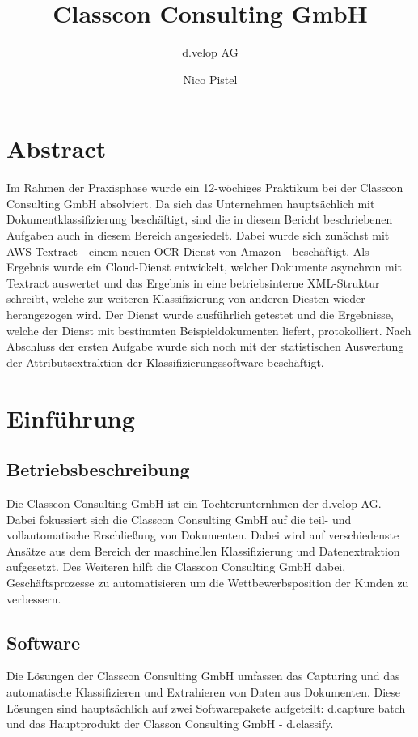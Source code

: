 \documentclass{whswinvcbook}
\title[Bericht]{Classcon Consulting GmbH}
\subtitle{d.velop AG}
\author[Nico Pistel]{Nico Pistel}
\begin{document}
\frontmatter

\maketitle

\cleardoublepage
\chapter*{Abstract}
Im Rahmen der Praxisphase wurde ein 12-wöchiges Praktikum bei der Classcon Consulting GmbH absolviert. Da sich das Unternehmen hauptsächlich mit Dokumentklassifizierung beschäftigt, sind die in diesem Bericht beschriebenen Aufgaben auch in diesem Bereich angesiedelt. Dabei wurde sich zunächst mit AWS Textract - einem neuen OCR Dienst von Amazon - beschäftigt. Als Ergebnis wurde ein Cloud-Dienst entwickelt, welcher Dokumente asynchron mit Textract auswertet und das Ergebnis in eine betriebsinterne XML-Struktur schreibt, welche zur weiteren Klassifizierung von anderen Diesten wieder herangezogen wird. Der Dienst wurde ausführlich getestet und die Ergebnisse, welche der Dienst mit bestimmten Beispieldokumenten liefert, protokolliert. Nach Abschluss der ersten Aufgabe wurde sich noch mit der statistischen Auswertung der Attributsextraktion der Klassifizierungssoftware beschäftigt.

\tableofs

\mainmatter

\chapter{Einführung}
\section{Betriebsbeschreibung}
Die Classcon Consulting GmbH ist ein Tochterunternhmen der d.velop AG. Dabei fokussiert sich die Classcon Consulting GmbH auf die teil- und vollautomatische Erschließung von Dokumenten. Dabei wird auf verschiedenste Ansätze aus dem Bereich der maschinellen Klassifizierung und Datenextraktion aufgesetzt. Des Weiteren hilft die Classcon Consulting GmbH dabei, Geschäftsprozesse zu automatisieren um die Wettbewerbsposition der Kunden zu verbessern.
\section{Software}
Die Lösungen der Classcon Consulting GmbH umfassen das Capturing und das automatische Klassifizieren und Extrahieren von Daten aus Dokumenten. Diese Lösungen sind hauptsächlich auf zwei Softwarepakete aufgeteilt: d.capture batch und das Hauptprodukt der Classon Consulting GmbH - d.classify.
\end{document}
